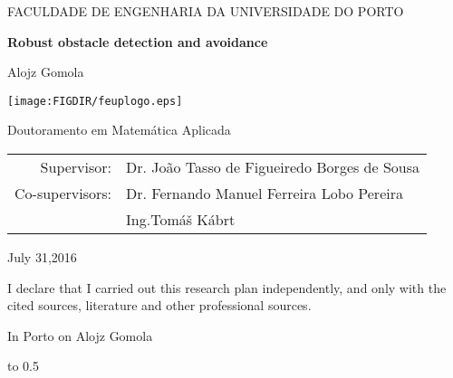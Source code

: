 \pagestyle{empty}
\begin{center}

{FACULDADE DE ENGENHARIA DA UNIVERSIDADE DO PORTO}

\vspace{3cm}
{\LARGE\bfseries Robust obstacle detection and avoidance}

\vspace{1cm}
{\LARGE Alojz Gomola}


\vspace{5cm}
\centerline{\mbox{\texttt{[image: \\FIGDIR/feuplogo.eps]}}}


\vspace{2cm}
{\LARGE Doutoramento em Matemática Aplicada}

\vspace{1.5cm}
\begin{tabular}{rl}
Supervisor: & Dr. João Tasso de Figueiredo Borges de Sousa \\   
\noalign{\vspace{2mm}}
Co-supervisors: & Dr. Fernando Manuel Ferreira Lobo Pereira\\
\noalign{\vspace{2mm}}
& Ing.Tomáš Kábrt\\ 
\end{tabular}

\vspace{2cm}
{July 31,2016}
\end{center}

\newpage

\noindent
I declare that I carried out this research plan  independently, and only with the cited sources, literature and other professional sources.

\vspace{18mm}
\noindent
In Porto on \makebox[2.5cm]{\dotfill}
\hspace*{\fill}
Alojz Gomola
\hspace*{\fill}



\newpage

\vbox to 0.5

\newpage
\openright

\pagestyle{plain}
\setcounter{page}{1}

\tableofcontents


\newpage
\listoffigures

\newpage
\listoftables